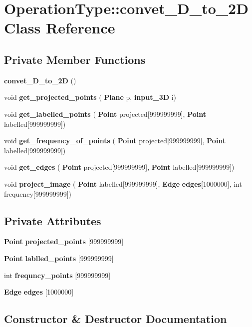 \section{Operation\+Type\+:\+:convet\+\_\+D\+\_\+to\+\_\+2D Class Reference}
\label{class_operation_type_1_1convet__3_d__to__2_d}
\subsection*{Private Member Functions}
\begin{DoxyCompactItemize}
\item 
\textbf{ convet\+\_\+D\+\_\+to\+\_\+2D} ()
\item 
void \textbf{ get\+\_\+projected\+\_\+points} (\textbf{ Plane} p, \textbf{ input\+\_\+3D} i)
\item 
void \textbf{ get\+\_\+labelled\+\_\+points} (\textbf{ Point} projected[999999999], \textbf{ Point} labelled[999999999])
\item 
void \textbf{ get\+\_\+frequency\+\_\+of\+\_\+points} (\textbf{ Point} projected[999999999], \textbf{ Point} labelled[999999999])
\item 
void \textbf{ get\+\_\+edges} (\textbf{ Point} projected[999999999], \textbf{ Point} labelled[999999999])
\item 
void \textbf{ project\+\_\+image} (\textbf{ Point} labelled[999999999], \textbf{ Edge} \textbf{ edges}[1000000], int frequency[999999999])
\end{DoxyCompactItemize}
\subsection*{Private Attributes}
\begin{DoxyCompactItemize}
\item 
\textbf{ Point} \textbf{ projected\+\_\+points} [999999999]
\item 
\textbf{ Point} \textbf{ lablled\+\_\+points} [999999999]
\item 
int \textbf{ frequncy\+\_\+points} [999999999]
\item 
\textbf{ Edge} \textbf{ edges} [1000000]
\end{DoxyCompactItemize}


\subsection{Constructor \& Destructor Documentation}
\mbox{\label{class_operation_type_1_1convet__3_d__to__2_d_a5d81ca25fd2ecb25bc2a16c60b490979}} 
